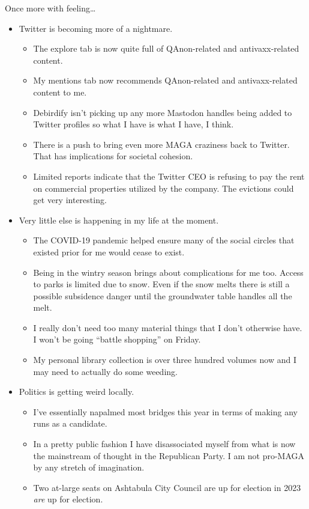 Once more with feeling\ldots{}

\begin{itemize}
\tightlist
\item
  Twitter is becoming more of a nightmare.

  \begin{itemize}
  \tightlist
  \item
    The explore tab is now quite full of QAnon-related and
    antivaxx-related content.
  \item
    My mentions tab now recommends QAnon-related and antivaxx-related
    content to me.
  \item
    Debirdify isn't picking up any more Mastodon handles being added to
    Twitter profiles so what I have is what I have, I think.
  \item
    There is a push to bring even more MAGA craziness back to Twitter.
    That has implications for societal cohesion.
  \item
    Limited reports indicate that the Twitter CEO is refusing to pay the
    rent on commercial properties utilized by the company. The evictions
    could get very interesting.
  \end{itemize}
\item
  Very little else is happening in my life at the moment.

  \begin{itemize}
  \tightlist
  \item
    The COVID-19 pandemic helped ensure many of the social circles that
    existed prior for me would cease to exist.
  \item
    Being in the wintry season brings about complications for me too.
    Access to parks is limited due to snow. Even if the snow melts there
    is still a possible subsidence danger until the groundwater table
    handles all the melt.
  \item
    I really don't need too many material things that I don't otherwise
    have. I won't be going ``battle shopping'' on Friday.
  \item
    My personal library collection is over three hundred volumes now and
    I may need to actually do some weeding.
  \end{itemize}
\item
  Politics is getting weird locally.

  \begin{itemize}
  \tightlist
  \item
    I've essentially napalmed most bridges this year in terms of making
    any runs as a candidate.
  \item
    In a pretty public fashion I have disassociated myself from what is
    now the mainstream of thought in the Republican Party. I am not
    pro-MAGA by any stretch of imagination.
  \item
    Two at-large seats on Ashtabula City Council are up for election in
    2023 \emph{are} up for election.


\end{itemize}
\end{itemize}
